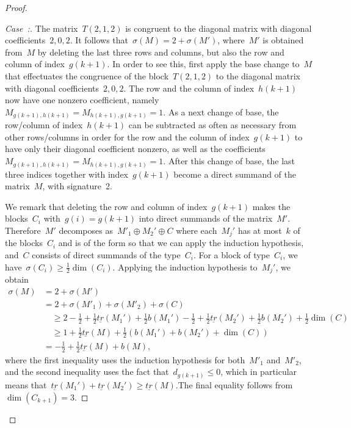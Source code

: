 \documentclass[AHL,Unicode,longabstracts,published]{cedram}
\newcounter{casecount}
\newenvironment{case}[1]{\refstepcounter{casecount}\begin{proof}[Case~\thecasecount:\;{#1}]}{\let\qed\relax\end{proof}}
\begin{document}
\begin{proof}
\begin{case}{{$C_{k+1} = T(2,1,2)$}}\label{casebis3}
The matrix~$T(2,1,2)$ is congruent to the diagonal matrix with diagonal coefficients~$2,0,2$. It follows that~$\sigma(M) = 2 + \sigma(M')$, where~$M'$ is obtained from~$M$ by deleting the last three rows and columns, but also the row and column of index~$g(k+1)$. In order to see this, first apply the base change to~$M$ that effectuates the congruence of the block~$T(2,1,2)$ to the diagonal matrix with diagonal coefficients~$2,0,2$. The row and the column of index~$h(k+1)$ now have one nonzero coefficient, namely~$M_{g(k+1),h(k+1)} = M_{h(k+1),g(k+1)} = 1$. As a next change of base, the row/column of index~$h(k+1)$ can be subtracted as often as necessary from other rows/columns in order for the row and the column of index~$g(k+1)$ to have only their diagonal coefficient nonzero, as well as the coefficients~$M_{g(k+1),h(k+1)} = M_{h(k+1),g(k+1)} = 1$. After this change of base, the last three indices together with index~$g(k+1)$ become a direct summand of the matrix~$M$, with signature~2.

We remark that deleting the row and column of index~$g(k+1)$ makes the blocks~$C_i$ with~$g(i) = g(k+1)$ into direct summands of the matrix~$M'$. Therefore~$M'$ decomposes as~$M'_1 \oplus M_2' \oplus C$ where each~$M_j'$ has at most~$k$ of the blocks~$C_i$ and is of the form so that we can apply the induction hypothesis, and~$C$ consists of direct summands of the type~$C_i$. For a block of type~$C_i$, we have~$\sigma(C_i) \ge \frac{1}{2}\dim(C_i)$. Applying the induction hypothesis to~$M_j'$, we obtain
\begin{align*}
\sigma(M) &= 2 + \sigma(M') \\
&= 2 + \sigma(M'_1) + \sigma(M'_2) + \sigma(C) \\
&\quad\ge 2 -\frac{1}{2} + \frac{1}{2}\underline{tr}(M_1')+ \frac{1}{2}b(M_1') -\frac{1}{2}+ \frac{1}{2}\underline{tr}(M_2')+\frac{1}{2}b(M_2') + \frac{1}{2}\dim(C) \\
&\quad\ge 1 + \frac{1}{2} \underline{tr}(M) + \frac{1}{2}\left(b(M_1') + b(M_2') + \dim(C)\right) \\
&= -\frac{1}{2} + \frac{1}{2} \underline{tr}(M) + b(M),
\end{align*}
where the first inequality uses the induction hypothesis for both~$M'_1$ and~$M'_2$, and the second inequality uses the fact that~$d_{g(k+1)}\le 0$, which in particular means that~$\underline{tr}(M_1') + \underline{tr}(M_2') \ge \underline{tr}(M)$.The final equality follows from~$\dim(C_{k+1}) = 3$.
\end{case}


\end{proof}
\end{document}
